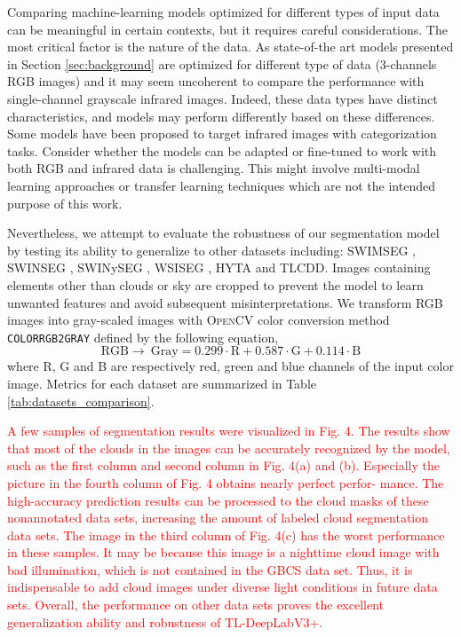 \documentclass[amt, article]{copernicus}
\begin{document}
Comparing machine-learning models optimized for different types of input data can be meaningful in certain contexts, but it requires careful considerations. The most critical factor is the nature of the data. As state-of-the art models presented in Section \ref{sec:background} are optimized for different type of data (3-channels RGB images) and it may seem uncoherent to compare the performance with single-channel grayscale infrared images. Indeed, these data types have distinct characteristics, and models may perform differently based on these differences.
Some models \cite{SUN2011278, Liu2021, amt-11-5351-2018} have been proposed to target infrared images with categorization tasks. Consider whether the models can be adapted or fine-tuned to work with both RGB and infrared data is challenging. This might involve multi-modal learning approaches \citep{liu2018multimodal, li2020deep, MMST} or transfer learning techniques \citep{manzo2021voting, Wang21, zhou2021novel} which are not the intended purpose of this work.

Nevertheless, we attempt to evaluate the robustness of our segmentation model by testing its ability to generalize to other datasets including: SWIMSEG \citep{dev2016colorbased}, SWINSEG \citep{SWINSEG, dev2017nighttime}, SWINySEG \citep{dev2019cloudsegnet}, WSISEG \citep{SegCloud}, HYTA \citep{HYTA} and TLCDD. Images containing elements other than clouds or sky are cropped to prevent the model to learn unwanted features and avoid subsequent misinterpretations. We transform RGB images into gray-scaled images with \textsc{OpenCV} \citep{OpenCV} color conversion method \texttt{COLORR\textunderscore GB2GRAY} defined by the following equation,
\begin{equation}
    \text{RGB} \rightarrow \: \text{Gray} = 0.299 \cdot \text{R} + 0.587 \cdot \text{G} + 0.114 \cdot \text{B}
    \label{eq:rgb_to_gray}
\end{equation}
where R, G and B are respectively red, green and blue channels of the input color image.
Metrics for each dataset are summarized in Table \ref{tab:datasets_comparison}.

\textcolor{red}{A few samples of segmentation results were visualized in Fig. 4.
The
results show that most of the clouds in the images can be
accurately recognized by the model, such as the first column
and second column in Fig. 4(a) and (b). Especially the picture
in the fourth column of Fig. 4 obtains nearly perfect perfor-
mance. The high-accuracy prediction results can be processed
to the cloud masks of these nonannotated data sets, increasing
the amount of labeled cloud segmentation data sets. The image in the third column
of Fig. 4(c) has the worst performance in these samples. It may
be because this image is a nighttime cloud image with bad
illumination, which is not contained in the GBCS data set.
Thus, it is indispensable to add cloud images under diverse
light conditions in future data sets. Overall, the performance
on other data sets proves the excellent generalization ability
and robustness of TL-DeepLabV3+.}
\end{document}
